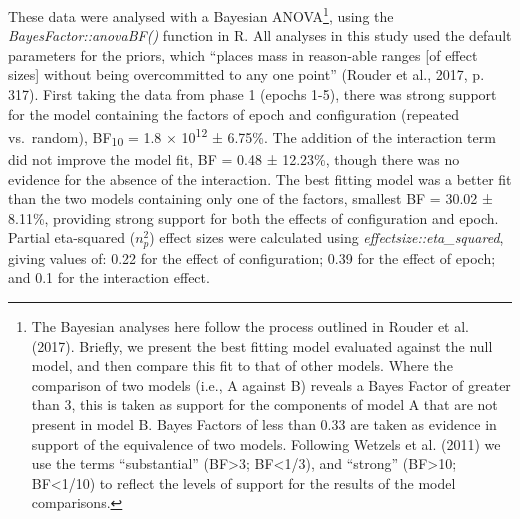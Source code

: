 \documentclass[
  man,
  floatsintext,
  longtable,
  nolmodern,
  notxfonts,
  notimes,
  colorlinks=true,linkcolor=blue,citecolor=blue,urlcolor=blue]{apa7}
\begin{document}
These data were analysed with a Bayesian ANOVA\footnote{The Bayesian
  analyses here follow the process outlined in Rouder et al. (2017).
  Briefly, we present the best fitting model evaluated against the null
  model, and then compare this fit to that of other models. Where the
  comparison of two models (i.e., A against B) reveals a Bayes Factor of
  greater than 3, this is taken as support for the components of model A
  that are not present in model B. Bayes Factors of less than 0.33 are
  taken as evidence in support of the equivalence of two models.
  Following Wetzels et al. (2011) we use the terms ``substantial''
  (BF\textgreater3; BF\textless1/3), and ``strong'' (BF\textgreater10;
  BF\textless1/10) to reflect the levels of support for the results of
  the model comparisons.}, using the \emph{BayesFactor::anovaBF()}
function in R. All analyses in this study used the default parameters
for the priors, which ``places mass in reason-able ranges {[}of effect
sizes{]} without being overcommitted to any one point'' (Rouder et al.,
2017, p. 317). First taking the data from phase 1 (epochs 1-5), there
was strong support for the model containing the factors of epoch and
configuration (repeated vs.~random), BF\textsubscript{10} = 1.8 ×
10\textsuperscript{12} ± 6.75\%. The addition of the interaction term
did not improve the model fit, BF = 0.48 ± 12.23\%, though there was no
evidence for the absence of the interaction. The best fitting model was
a better fit than the two models containing only one of the factors,
smallest BF = 30.02 ± 8.11\%, providing strong support for both the
effects of configuration and epoch. Partial eta-squared (\(n^2_p\))
effect sizes were calculated using \emph{effectsize::eta\_squared},
giving values of: 0.22 for the effect of configuration; 0.39 for the
effect of epoch; and 0.1 for the interaction effect.
\end{document}

